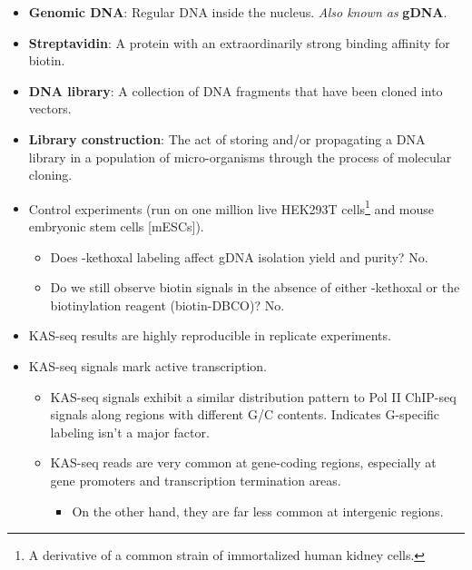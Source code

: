 \documentclass[../notes.tex]{subfiles}
\begin{document}
\begin{itemize}
\begin{itemize}
        \item Enrich the fragments with \textbf{streptavidin} beads.
        \item Subject them to \textbf{library construction}.
        \item Remove -kethoxal labels with a short heating at \SI{95}{\celsius}.
        \item Perform a PCR amplification.
        \item The whole process takes about 1 day.
    \end{itemize}
    \item \textbf{Genomic DNA}: Regular DNA inside the nucleus. \emph{Also known as} \textbf{gDNA}.
    \item \textbf{Streptavidin}: A protein with an extraordinarily strong binding affinity for biotin.
    \item \textbf{DNA library}: A collection of DNA fragments that have been cloned into vectors.
    \item \textbf{Library construction}: The act of storing and/or propagating a DNA library in a population of micro-organisms through the process of molecular cloning.
    \item Control experiments (run on one million live HEK293T cells\footnote{A derivative of a common strain of immortalized human kidney cells.} and mouse embryonic stem cells [mESCs]).
    \begin{itemize}
        \item Does -kethoxal labeling affect gDNA isolation yield and purity? No.
        \item Do we still observe biotin signals in the absence of either -kethoxal or the biotinylation reagent (biotin-DBCO)? No.
    \end{itemize}
    \item KAS-seq results are highly reproducible in replicate experiments.
    \item KAS-seq signals mark active transcription.
    \begin{itemize}
        \item KAS-seq signals exhibit a similar distribution pattern to Pol II ChIP-seq signals along regions with different G/C contents. Indicates G-specific labeling isn't a major factor.
        \item KAS-seq reads are very common at gene-coding regions, especially at gene promoters and transcription termination areas.
        \begin{itemize}
            \item On the other hand, they are far less common at intergenic regions.

\end{itemize}
\end{itemize}
\end{itemize}
\end{document}
